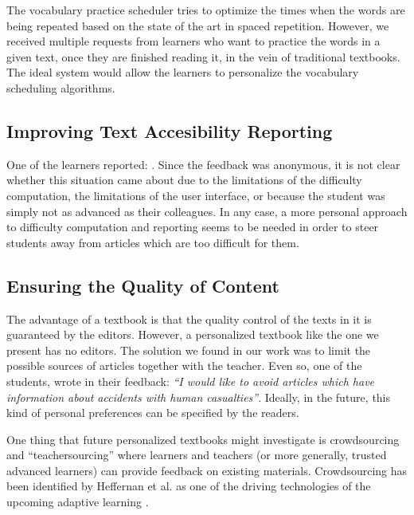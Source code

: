 The vocabulary practice scheduler tries to optimize the times when the words are being repeated based on the state of the art in spaced repetition. However, we received multiple requests from learners who want to practice the words in a given text, once they are finished reading it, in the vein of traditional textbooks. The ideal system would allow the learners to personalize the vocabulary scheduling algorithms. 


\subsection{Improving Text Accesibility Reporting}
One of the learners reported: . Since the feedback was anonymous, it is not clear whether this situation came about due to the limitations of the difficulty computation, the limitations of the user interface, or because the student was simply not as advanced as their colleagues. In any case, a more personal approach to difficulty computation and reporting seems to be needed in order to steer students away from articles which are too difficult for them. 


\subsection{Ensuring the Quality of Content}
The advantage of a textbook is that the quality control of the texts in it is guaranteed by the editors. However, a personalized textbook like the one we present has no editors. The solution we found in our work was to limit the possible sources of articles together with the teacher. Even so, one of the students, wrote in their feedback: {\em ``I would like to avoid articles which have information about accidents with human casualties''}. Ideally, in the future, this kind of personal preferences can be specified by the readers.

One thing that future personalized textbooks might investigate is crowdsourcing and ``teachersourcing'' where learners and teachers (or more generally, trusted advanced learners) can provide feedback on existing materials. Crowdsourcing has been identified by Heffernan et al. as one of the driving technologies of the upcoming adaptive learning \cite{Heff16-crowdsourcing}. 

